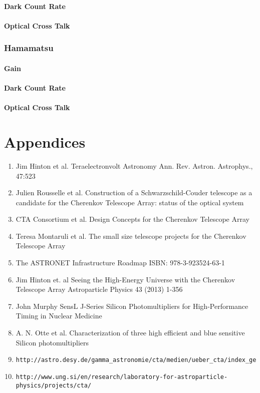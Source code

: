 \documentclass[article,type=msc,colorback,accentcolor=tud9c]{tudthesis}
\begin{document}
        \subsubsection{Dark Count Rate}
        \subsubsection{Optical Cross Talk}

    \subsection{Hamamatsu}

        \subsubsection{Gain}
        \subsubsection{Dark Count Rate}
        \subsubsection{Optical Cross Talk}





\newpage
\chapter{Appendices}
\begin{enumerate}
\item Jim Hinton et al. Teraelectronvolt Astronomy Ann. Rev. Astron. Astrophys., 47:523
\item Julien Rousselle et al. Construction of a Schwarzschild-Couder telescope as a candidate for the Cherenkov Telescope Array: status of the optical system
\item CTA Consortium et al. Design Concepts for the Cherenkov Telescope Array
\item Teresa Montaruli et al. The small size telescope projects for the Cherenkov Telescope Array
\item The ASTRONET Infrastructure Roadmap ISBN: 978-3-923524-63-1
\item Jim Hinton et. al Seeing the High-Energy Universe with the Cherenkov Telescope Array Astroparticle Physics 43 (2013) 1-356 
\item John Murphy SensL J-Series Silicon Photomultipliers for High-Performance Timing in Nuclear Medicine 
\item A. N. Otte et al. Characterization of three high efficient and blue sensitive Silicon photomultipliers
\item \begin{verbatim}http://astro.desy.de/gamma_astronomie/cta/medien/ueber_cta/index_ger.html\end{verbatim}
\item \begin{verbatim}http://www.ung.si/en/research/laboratory-for-astroparticle-physics/projects/cta/\end{verbatim}
\end{enumerate}
\end{document}

